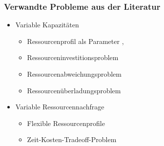 \begin{frame}[noframenumbering]
\frametitle{Verwandte Probleme aus der Literatur}
\begin{itemize}
\item Variable Kapazitäten
\begin{itemize}
\item Ressourcenprofil als Parameter {\footnotesize \cite{Klein2000}, \cite{Hartmann2012}}
\item Ressourceninvestitionsproblem {\footnotesize \cite{Mohring1984}}
\item Ressourcenabweichungsproblem {\footnotesize \cite{Neumann2003}} 
\item Ressourcenüberladungsproblem {\footnotesize \cite{Neumann2003}}
\end{itemize}
\vspace*{4mm}
\item Variable Ressourcennachfrage
\begin{itemize}
\item Flexible Ressourcenprofile {\footnotesize \cite{Ranjbar2010}}
\item Zeit-Kosten-Tradeoff-Problem {\footnotesize \cite{Demeulemeester1996}}
\end{itemize}
\end{itemize}

\end{frame}


